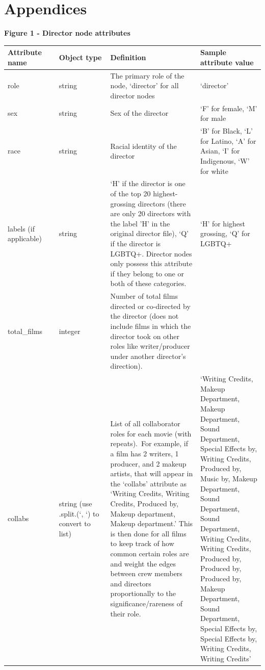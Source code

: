 \documentclass[12pt]{article}
\begin{document}
\section*{Appendices}
\begin{table}
\textbf{Figure 1 - Director node attributes}
\centering
\begin{tabular}{|>{\raggedright\arraybackslash}p{0.2\linewidth}|>{\raggedright\arraybackslash}p{0.2\linewidth}|>{\raggedright\arraybackslash}p{0.35\linewidth}|>{\raggedright\arraybackslash}p{0.25\linewidth}|}
\hline
\textbf{Attribute name}& \textbf{Object type}& \textbf{Definition}& \textbf{Sample attribute value}\\
\hline
role & string & The primary role of the node, ‘director’ for all director nodes & ‘director’ \\
\hline
sex & string & Sex of the director & ‘F’ for female, ‘M’ for male \\
\hline
race & string & Racial identity of the director & ‘B’ for Black, ‘L’ for Latino, ‘A’ for Asian, ‘I’ for Indigenous, ‘W’ for white \\
\hline
labels (if applicable) & string & ‘H’ if the director is one of the top 20 highest-grossing directors (there are only 20 directors with the label 'H' in the original director file), ‘Q’ if the director is LGBTQ+. Director nodes only possess this attribute if they belong to one or both of these categories.  & ‘H’ for highest grossing, ‘Q’ for LGBTQ+ \\
\hline
total\_films & integer & Number of total films directed or co-directed by the director (does not include films in which the director took on other roles like writer/producer under another director’s direction). & 36 \\
\hline
collabs & string (use .split.(‘, ‘) to convert to list) & List of all collaborator roles for each movie (with repeats). For example, if a film has 2 writers, 1 producer, and 2 makeup artists, that will appear in the ‘collabs’ attribute as ‘Writing Credits, Writing Credits, Produced by, Makeup department, Makeup department.’ This is then done for all films to keep track of how common certain roles are and weight the edges between crew members and directors proportionally to the significance/rareness of their role.  & ‘Writing Credits, Makeup Department, Makeup Department, Sound Department, Special Effects by, Writing Credits, Produced by, Music by, Makeup Department, Sound Department, Sound Department, Writing Credits, Writing Credits, Produced by, Produced by, Produced by, Makeup Department, Sound Department, Special Effects by, Special Effects by, Writing Credits, Writing Credits’ \\
\hline

\end{tabular}

\end{table}
\end{document}
